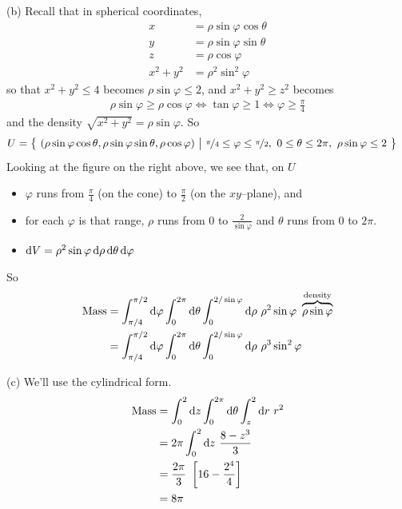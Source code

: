 \begin{solution}
(b)
Recall that in spherical coordinates,
\begin{align*}
x&=\rho\sin\varphi\cos\theta \\
y&=\rho\sin\varphi\sin\theta \\
z&=\rho\cos\varphi \\
x^2+y^2 &=\rho^2\sin^2\varphi
\end{align*}
so that $x^2+y^2\le 4$ becomes $\rho\sin\varphi\le 2$,
and $x^2+y^2\ge z^2$ becomes
\begin{align*}
\rho\sin\varphi \ge \rho\cos\varphi 
\iff
\tan\varphi\ge 1
\iff
\varphi\ge\frac{\pi}{4}
\end{align*}
and the density $\sqrt{x^2+y^2}=\rho\sin\varphi$. 
So 
\begin{align*}
U&=\Set{(\rho\sin\varphi\cos\theta,\rho\sin\varphi\sin\theta,\rho\cos\varphi)}
 {\nicefrac{\pi}{4}\le\varphi\le\nicefrac{\pi}{2},\ 
     0\le \theta\le 2\pi,\ \rho\sin\varphi\le 2}
\end{align*}
Looking at the figure on the right above, we see that, on $U$
\begin{itemize}
\item 
  $\varphi$ runs from $\frac{\pi}{4}$ (on the cone) to 
     $\frac{\pi}{2}$ (on the $xy$--plane), and
\item
  for each $\varphi$ is that range, $\rho$ runs from $0$ 
         to $\frac{2}{\sin\varphi}$
  and $\theta$ runs from $0$ to $2\pi$.
\item $\mathrm{d}V =\rho^2\sin\varphi\,\mathrm{d}\rho\,\mathrm{d}\theta\,\mathrm{d}\varphi$
\end{itemize}
So
\begin{align*}
\text{Mass}&= \int_{\pi/4}^{\pi/2}\dee{\varphi}\int_0^{2\pi}\dee{\theta}
            \int_0^{2/\sin\varphi}\dee{\rho}\ 
             \rho^2\sin\varphi\ \overbrace{\rho\sin\varphi}^{\text{density}} \\
&= \int_{\pi/4}^{\pi/2}\dee{\varphi}\int_0^{2\pi}\dee{\theta}
            \int_0^{2/\sin\varphi}\dee{\rho}\ 
                  \rho^3\sin^2\varphi
\end{align*}

(c) We'll use the cylindrical form.
\begin{align*}
\text{Mass}
&= \int_0^2\dee{z}\int_0^{2\pi}\dee{\theta}\int_z^2\dee{r}\ 
                  r^2 \\
&=2\pi \int_0^2\dee{z}\ \frac{8-z^3}{3} \\
&=\frac{2\pi}{3}\ \left[16-\frac{2^4}{4}\right] \\
&=8\pi
\end{align*}
\end{solution}


